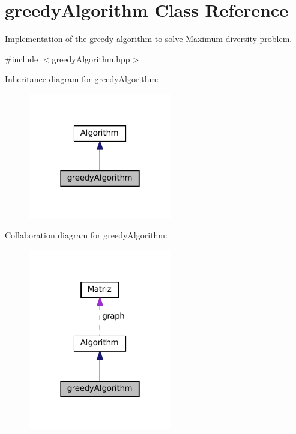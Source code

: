 \hypertarget{classgreedyAlgorithm}{}\section{greedy\+Algorithm Class Reference}
\label{classgreedyAlgorithm}


Implementation of the greedy algorithm to solve Maximum diversity problem.  




{\ttfamily \#include $<$greedy\+Algorithm.\+hpp$>$}



Inheritance diagram for greedy\+Algorithm\+:
\nopagebreak
\begin{figure}[H]
\begin{center}
\leavevmode
\includegraphics[width=178pt]{classgreedyAlgorithm__inherit__graph}
\end{center}
\end{figure}


Collaboration diagram for greedy\+Algorithm\+:
\nopagebreak
\begin{figure}[H]
\begin{center}
\leavevmode
\includegraphics[width=178pt]{classgreedyAlgorithm__coll__graph}
\end{center}
\end{figure}

